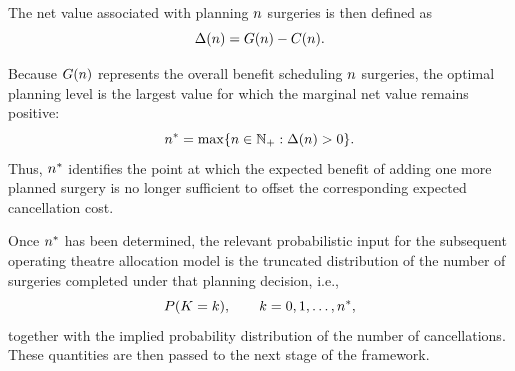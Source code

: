 The net value associated with planning $n$ surgeries is then defined as
\begin{equation}\label{eq:net_value_revised}
    \Delta(n)=G(n)-C(n).
\end{equation}

Because $G(n)$ represents the overall benefit scheduling $n$ surgeries, the optimal planning level is the largest value for which the marginal net value remains positive:
\begin{equation}\label{eq:optimal_planned_surgeries}
    n^*=\max\{n \in \mathbb{N}_{+} : \Delta(n)>0\}.
\end{equation}
Thus, $n^*$ identifies the point at which the expected benefit of adding one more planned surgery is no longer sufficient to offset the corresponding expected cancellation cost.

Once $n^*$ has been determined, the relevant probabilistic input for the subsequent operating theatre allocation model is the truncated distribution of the number of surgeries completed under that planning decision, i.e.,
\[
P(K = k), \qquad k=0,1,\dots,n^*,
\]
together with the implied probability distribution of the number of cancellations. These quantities are then passed to the next stage of the framework.